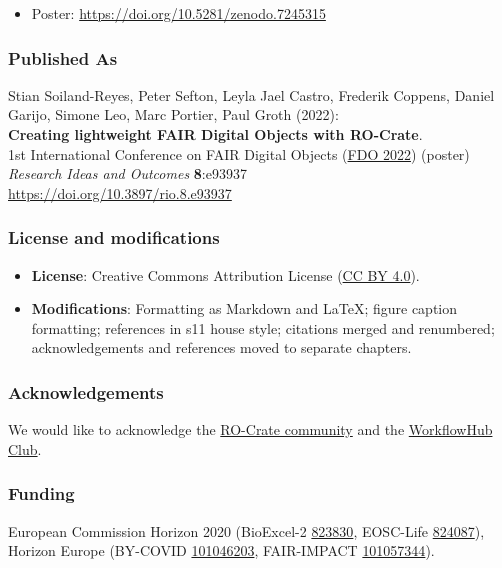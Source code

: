 \begin{itemize}
\item
  Poster: \url{https://doi.org/10.5281/zenodo.7245315}
\end{itemize}

\subsubsection*{Published As}
Stian Soiland-Reyes, Peter Sefton, Leyla Jael Castro, Frederik Coppens,
Daniel Garijo, Simone Leo, Marc Portier, Paul Groth (2022):\\
\textbf{Creating lightweight FAIR Digital Objects with RO-Crate}.\\
1st International Conference on FAIR Digital Objects
(\href{https://www.fdo2022.org/}{FDO 2022}) (poster)\\
\emph{Research Ideas and Outcomes} \textbf{8}:e93937\\
\url{https://doi.org/10.3897/rio.8.e93937}


\subsubsection*{License and modifications}

\begin{itemize}
\tightlist
\item
  \textbf{License}: Creative Commons Attribution License
  (\href{https://spdx.org/licenses/CC-BY-4.0}{CC BY 4.0}).
\item
  \textbf{Modifications}: Formatting as Markdown and LaTeX; figure caption
  formatting; references in s11 house style; citations merged and renumbered; 
  acknowledgements and references moved to separate chapters.
\end{itemize}

\subsubsection*{Acknowledgements}

We would like to acknowledge the
\href{https://www.researchobject.org/ro-crate/community.html}{RO-Crate
community} and the
\href{https://about.workflowhub.eu/project/acknowledgements/}{WorkflowHub
Club}.

\subsubsection*{Funding}

European Commission Horizon 2020 (BioExcel-2
\href{https://cordis.europa.eu/project/id/823830}{823830}, EOSC-Life
\href{https://cordis.europa.eu/project/id/824087}{824087}), Horizon
Europe (BY-COVID
\href{https://cordis.europa.eu/project/id/101046203}{101046203},
FAIR-IMPACT
\href{https://cordis.europa.eu/project/id/101057344}{101057344}).

